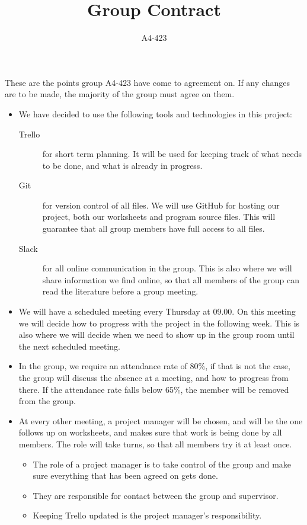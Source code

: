\documentclass[a4paper,12pt,hidelinks]{article}
\newcommand{\group}{A4-423}
\begin{document}
	\title{Group Contract}
	\author{\group}
	\maketitle
	
	These are the points group A4-423 have come to agreement on. If any changes are to be made, the majority of the group must agree on them.
	\begin{itemize}
		\item We have decided to use the following tools and technologies in this project:
		\begin{description}
			\item[Trello] for short term planning. It will be used for keeping track of what needs to be done, and what is already in progress.
			\item[Git] for version control of all files. We will use GitHub for hosting our project, both our worksheets and program source files. This will guarantee that all group members have full access to all files.
			\item[Slack] for all online communication in the group. This is also where we will share information we find online, so that all members of the group can read the literature before a group meeting. 
		\end{description}
		\item We will have a scheduled meeting every Thursday at 09.00. On this meeting we will decide how to progress with the project in the following week. This is also where we will decide when we need to show up in the group room until the next scheduled meeting.
		\item In the group, we require an attendance rate of 80\%, if that is not the case, the group will discuss the absence at a meeting, and how to progress from there. If the attendance rate falls below 65\%, the member will be removed from the group.
		\item At every other meeting, a project manager will be chosen, and will be the one follows up on worksheets, and makes sure that work is being done by all members. The role will take turns, so that all members try it at least once.
		\begin{itemize}
		\item The role of a project manager is to take control of the group and make sure everything that has been agreed on gets done.
		\item They are responsible for contact between the group and supervisor.
		\item Keeping Trello updated is the project manager's responsibility.

\end{itemize}
\end{itemize}
\end{document}
